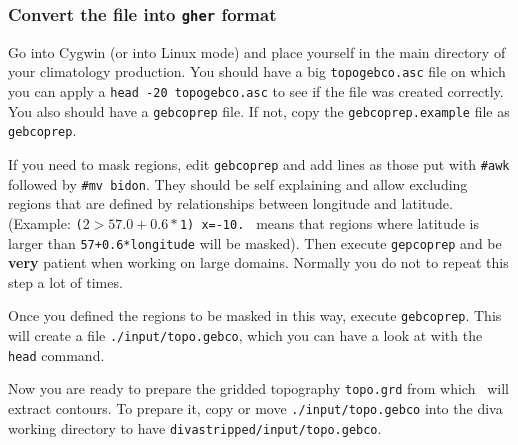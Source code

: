 \subsubsection{Convert the file into \texttt{gher} format}

%
%
%
%

Go into Cygwin (or into Linux mode) and place yourself in the main directory of your climatology production. You should have a big {\tt topogebco.asc} file on which you can apply a {\tt head -20 topogebco.asc} to see if the file was created correctly. You also should have a {\tt gebcoprep} file. If not, copy the {\tt gebcoprep.example} file as {\tt gebcoprep}.

If you need to mask regions, edit {\tt gebcoprep} and add lines as those put with {\tt \#awk} followed by {\tt \#mv bidon}. They should be self explaining and allow excluding regions that are defined by relationships between longitude and latitude. (Example: {\tt ($2 > 57.0+0.6*$1) {x=-10.} } means that regions where latitude is larger than \texttt{57+0.6*longitude} will be masked). Then execute {\tt gepcoprep} and be {\bf very} patient when working on large domains. Normally you do not to repeat this step a lot of times.

Once you defined the regions to be masked in this way, execute {\tt gebcoprep}. This will create a file
{\tt ./input/topo.gebco}, which you can have a look at with the {\tt head} command.

Now you are ready to prepare the gridded topography {\tt topo.grd} from which \diva\, will extract contours. To prepare it,
copy or move {\tt ./input/topo.gebco} into the diva working directory to have {\tt divastripped/input/topo.gebco}.


